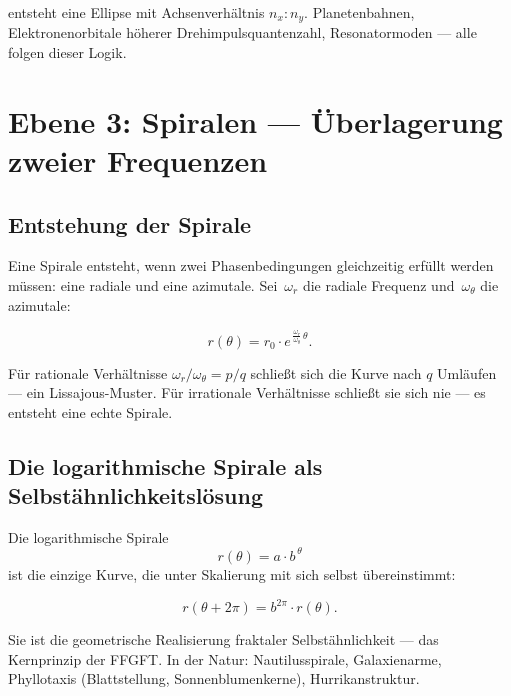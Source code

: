 entsteht eine Ellipse mit Achsenverhältnis $n_x : n_y$. Planetenbahnen,
Elektronenorbitale höherer Drehimpulsquantenzahl, Resonatormoden —
alle folgen dieser Logik.

\section{Ebene 3: Spiralen — Überlagerung zweier Frequenzen}

\subsection{Entstehung der Spirale}

Eine Spirale entsteht, wenn zwei Phasenbedingungen gleichzeitig erfüllt
werden müssen: eine radiale und eine azimutale. Sei~$\omega_r$ die
radiale Frequenz und~$\omega_\theta$ die azimutale:

\begin{equation}
  r(\theta) = r_0 \cdot e^{\,\frac{\omega_r}{\omega_\theta}\,\theta}.
\end{equation}

Für rationale Verhältnisse $\omega_r/\omega_\theta = p/q$ schließt
sich die Kurve nach $q$ Umläufen — ein Lissajous-Muster.
Für irrationale Verhältnisse schließt sie sich nie — es entsteht
eine echte Spirale.

\subsection{Die logarithmische Spirale als Selbstähnlichkeitslösung}

Die logarithmische Spirale
\begin{equation}
  r(\theta) = a \cdot b^{\,\theta}
\end{equation}
ist die einzige Kurve, die unter Skalierung mit sich selbst übereinstimmt:

\begin{equation}
  r(\theta + 2\pi) = b^{2\pi} \cdot r(\theta).
\end{equation}

Sie ist die geometrische Realisierung fraktaler Selbstähnlichkeit —
das Kernprinzip der FFGFT. In der Natur: Nautilusspirale, Galaxienarme,
Phyllotaxis (Blattstellung, Sonnenblumenkerne), Hurrikanstruktur.

